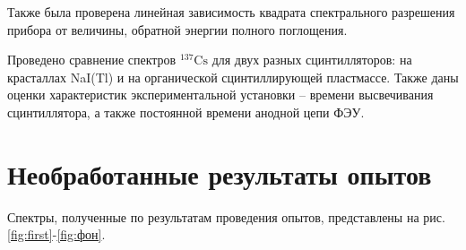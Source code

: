 \documentclass[a4paper]{article}
\newcommand{\isotope}[2]{$ ^{#2}\mathrm{#1} $}
\begin{document}
Также была проверена линейная зависимость квадрата спектрального разрешения прибора от величины, обратной энергии полного поглощения.

Проведено сравнение спектров \isotope{Cs}{137} для двух разных сцинтилляторов: на красталлах NaI(Tl) и на органической сцинтиллирующей пластмассе. Также даны оценки характеристик экспериментальной установки -- времени высвечивания сцинтиллятора, а также постоянной времени анодной цепи ФЭУ.

\appendix
\section{Необработанные результаты опытов}

Спектры, полученные по результатам проведения опытов, представлены на рис. \ref{fig:first}-\ref{fig:фон}.
\end{document}

